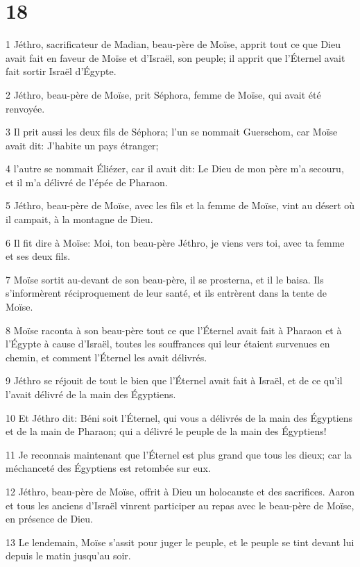 \chapter{18}

\par 1 Jéthro, sacrificateur de Madian, beau-père de Moïse, apprit tout ce que Dieu avait fait en faveur de Moïse et d'Israël, son peuple; il apprit que l'Éternel avait fait sortir Israël d'Égypte.
\par 2 Jéthro, beau-père de Moïse, prit Séphora, femme de Moïse, qui avait été renvoyée.
\par 3 Il prit aussi les deux fils de Séphora; l'un se nommait Guerschom, car Moïse avait dit: J'habite un pays étranger;
\par 4 l'autre se nommait Éliézer, car il avait dit: Le Dieu de mon père m'a secouru, et il m'a délivré de l'épée de Pharaon.
\par 5 Jéthro, beau-père de Moïse, avec les fils et la femme de Moïse, vint au désert où il campait, à la montagne de Dieu.
\par 6 Il fit dire à Moïse: Moi, ton beau-père Jéthro, je viens vers toi, avec ta femme et ses deux fils.
\par 7 Moïse sortit au-devant de son beau-père, il se prosterna, et il le baisa. Ils s'informèrent réciproquement de leur santé, et ils entrèrent dans la tente de Moïse.
\par 8 Moïse raconta à son beau-père tout ce que l'Éternel avait fait à Pharaon et à l'Égypte à cause d'Israël, toutes les souffrances qui leur étaient survenues en chemin, et comment l'Éternel les avait délivrés.
\par 9 Jéthro se réjouit de tout le bien que l'Éternel avait fait à Israël, et de ce qu'il l'avait délivré de la main des Égyptiens.
\par 10 Et Jéthro dit: Béni soit l'Éternel, qui vous a délivrés de la main des Égyptiens et de la main de Pharaon; qui a délivré le peuple de la main des Égyptiens!
\par 11 Je reconnais maintenant que l'Éternel est plus grand que tous les dieux; car la méchanceté des Égyptiens est retombée sur eux.
\par 12 Jéthro, beau-père de Moïse, offrit à Dieu un holocauste et des sacrifices. Aaron et tous les anciens d'Israël vinrent participer au repas avec le beau-père de Moïse, en présence de Dieu.
\par 13 Le lendemain, Moïse s'assit pour juger le peuple, et le peuple se tint devant lui depuis le matin jusqu'au soir.
